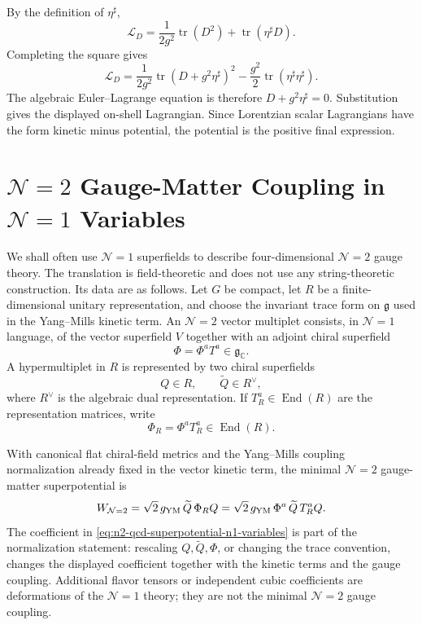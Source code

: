 By the definition of \(\eta^\sharp\),
\[
  \mathcal L_D
  =
  \frac{1}{2g^2}\operatorname{tr}(D^2)
  +\operatorname{tr}(\eta^\sharp D).
\]
Completing the square gives
\[
  \mathcal L_D
  =
  \frac{1}{2g^2}
  \operatorname{tr}\!\left(D+g^2\eta^\sharp\right)^2
  -\frac{g^2}{2}\operatorname{tr}(\eta^\sharp\eta^\sharp).
\]
The algebraic Euler--Lagrange equation is therefore
\(D+g^2\eta^\sharp=0\).  Substitution gives the displayed on-shell
Lagrangian.  Since Lorentzian scalar Lagrangians have the form kinetic minus
potential, the potential is the positive final expression.

\section{\texorpdfstring{\(\mathcal N=2\) Gauge-Matter Coupling in
\(\mathcal N=1\) Variables}{N=2 Gauge-Matter Coupling in N=1 Variables}}

We shall often use \(\mathcal N=1\) superfields to describe
four-dimensional \(\mathcal N=2\) gauge theory.  The translation is
field-theoretic and does not use any string-theoretic construction.  Its
data are as follows.  Let \(G\) be compact, let \(R\) be a finite-dimensional
unitary representation, and choose the invariant trace form on
\(\mathfrak g\) used in the Yang--Mills kinetic term.  An
\(\mathcal N=2\) vector multiplet consists, in \(\mathcal N=1\) language, of
the vector superfield \(V\) together with an adjoint chiral superfield
\[
  \Phi=\Phi^a T^a\in\mathfrak g_{\mathbb C}.
\]
A hypermultiplet in \(R\) is represented by two chiral superfields
\[
  Q\in R,
  \qquad
  \widetilde Q\in R^\vee ,
\]
where \(R^\vee\) is the algebraic dual representation.  If
\(T_R^a\in\operatorname{End}(R)\) are the representation matrices, write
\[
  \Phi_R=\Phi^aT_R^a\in\operatorname{End}(R).
\]

With canonical flat chiral-field metrics and the Yang--Mills coupling
normalization already fixed in the vector kinetic term, the minimal
\(\mathcal N=2\) gauge-matter superpotential is
\begin{equation}
  W_{\mathcal N=2}
  =
  \sqrt2\,g_{\rm YM}\,\widetilde Q\,\Phi_R Q
  =
  \sqrt2\,g_{\rm YM}\,\Phi^a\,\widetilde Q\,T_R^a Q .
  \label{eq:n2-qcd-superpotential-n1-variables}
\end{equation}
The coefficient in \eqref{eq:n2-qcd-superpotential-n1-variables} is part of
the normalization statement: rescaling \(Q,\widetilde Q,\Phi\), or changing
the trace convention, changes the displayed coefficient together with the
kinetic terms and the gauge coupling.  Additional flavor tensors or
independent cubic coefficients are deformations of the \(\mathcal N=1\)
theory; they are not the minimal \(\mathcal N=2\) gauge coupling.

